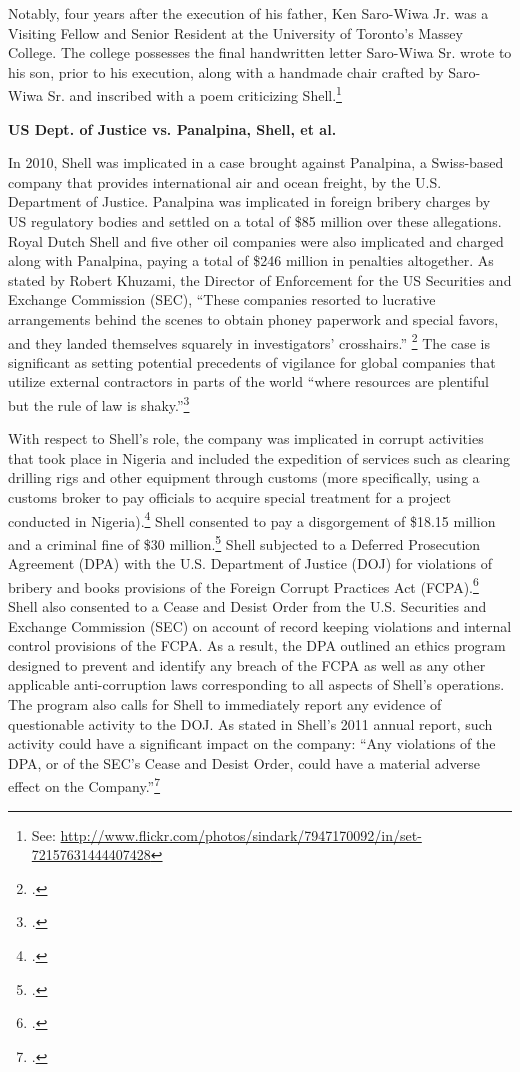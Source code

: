 Notably, four years after the execution of his father, Ken Saro-Wiwa Jr. was a Visiting Fellow and Senior Resident at the University of Toronto's Massey College.
The college possesses the final handwritten letter Saro-Wiwa Sr. wrote to his son, prior to his execution, along with a handmade chair crafted by Saro-Wiwa Sr. and inscribed with a poem criticizing Shell.\footnote{See: \url{http://www.flickr.com/photos/sindark/7947170092/in/set-72157631444407428}}



\textbf{US Dept. of Justice vs. Panalpina, Shell, et al.}



In 2010, Shell was implicated in a case brought against Panalpina, a Swiss-based company that provides international air and ocean freight, by the U.S. Department of Justice. 
Panalpina was implicated in foreign bribery charges by US regulatory bodies and settled on a total of \$85 million over these allegations. 
Royal Dutch Shell and five other oil companies were also implicated and charged along with Panalpina, paying a total of \$246 million in penalties altogether. 
As stated by Robert Khuzami, the Director of Enforcement for the US Securities and Exchange Commission (SEC), ``These companies resorted to lucrative arrangements behind the scenes to obtain phoney paperwork and special favors, and they landed themselves squarely in investigators’ crosshairs.'' \footcite[][p. 119]{KochanGoodYear_2011} 
The case is significant as setting potential precedents of vigilance for global companies that utilize external contractors in parts of the world ``where resources are plentiful but the rule of law is shaky.''\footcite[][]{Bribery_2010}



With respect to Shell's role, the company was implicated in corrupt activities that took place in Nigeria and included the expedition of services such as clearing drilling rigs and other equipment through customs (more specifically, using a customs broker to pay officials to acquire special treatment for a project conducted in Nigeria).\footcite[][]{ShellBribes_2010}
Shell consented to pay a disgorgement of \$18.15 million and a criminal fine of \$30 million.\footcite[][]{SullivanCromwell_2010}
Shell subjected to a Deferred Prosecution Agreement (DPA) with the U.S. Department of Justice (DOJ) for violations of bribery and books provisions of the Foreign Corrupt Practices Act (FCPA).\footcite[][p.17]{Shell_2011}
Shell also consented to a Cease and Desist Order from the U.S. Securities and Exchange Commission (SEC) on account of record keeping violations and internal control provisions of the FCPA. 
As a result, the DPA outlined an ethics program designed to prevent and identify any breach of the FCPA as well as any other applicable anti-corruption laws corresponding to all aspects of Shell’s operations. 
The program also calls for Shell to immediately report any evidence of questionable activity to the DOJ. 
As stated in Shell's 2011 annual report, such activity could have a significant impact on the company: ``Any violations of the DPA, or of the SEC's Cease and Desist Order, could have a material adverse effect on the Company.''\footcite[][]{Shell_2011}



